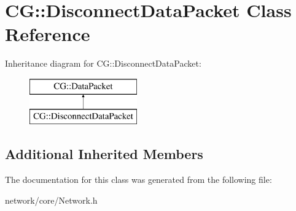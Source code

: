 \hypertarget{class_c_g_1_1_disconnect_data_packet}{}\section{CG\+:\+:Disconnect\+Data\+Packet Class Reference}
\label{class_c_g_1_1_disconnect_data_packet}
Inheritance diagram for CG\+:\+:Disconnect\+Data\+Packet\+:\begin{figure}[H]
\begin{center}
\leavevmode
\includegraphics[height=2.000000cm]{class_c_g_1_1_disconnect_data_packet}
\end{center}
\end{figure}
\subsection*{Additional Inherited Members}


The documentation for this class was generated from the following file\+:\begin{DoxyCompactItemize}
\item 
network/core/Network.\+h\end{DoxyCompactItemize}
